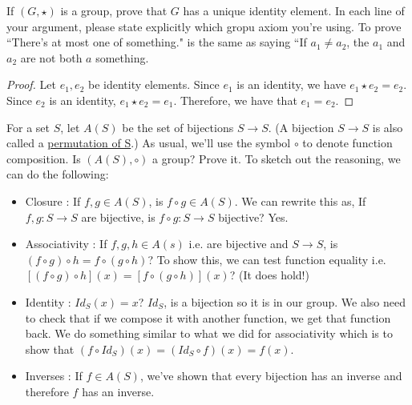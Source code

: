 \begin{example}
If $(G, \star)$ is a group, prove that $G$ has a unique identity element. In each line of your argument, please state explicitly which gropu axiom you're using. To prove ``There's at most one of something." is the same as saying ``If $a_1 \neq a_2$, the $a_1$ and $a_2$ are not both $a$ something. 
\begin{proof}
Let $e_1, e_2$ be  identity elements. Since $e_1$ is an identity, we have $e_1 \star e_2 = e_2$. Since $e_2$ is an identity, $e_1 \star e_2 = e_1$. Therefore, we have that $e_1 = e_2$.
\end{proof}
\end{example}
\begin{example}
For a set $S$, let $A(S)$ be the set of bijections $S\to S$. (A bijection $S\to S$ is also called a \underline{permutation of S}.) As usual, we'll use the symbol $\circ$ to denote function composition. Is $(A(S), \circ)$ a group? Prove it. To sketch out the reasoning, we can do the following:
\begin{itemize}
    \item Closure : If $f, g \in A(S)$, is $f \circ g \in A(S)$. We can rewrite this as, If $f, g : S\to S$ are bijective, is $f\circ g : S\to S$ bijective? Yes.
    \item Associativity : If $f, g, h \in A(s)$ i.e. are bijective and $S\to S$, is $(f\circ g) \circ h = f\circ (g\circ h)$? To show this, we can test function equality i.e. $[(f\circ g) \circ h](x) = [f \circ (g\circ h)](x)$? (It does hold!)
    \item Identity : $Id_S(x)=x$? $Id_S$, is a bijection so it is in our group. We also need to check that if we compose it with another function, we get that function back. We do something similar to what we did for associativity which is to show that $(f\circ Id_S)(x) = (Id_S \circ f)(x) = f(x)$.
    \item Inverses : If $f \in A(S)$, we've shown that every bijection has an inverse and therefore $f$ has an inverse. 
\end{itemize}
\end{example}